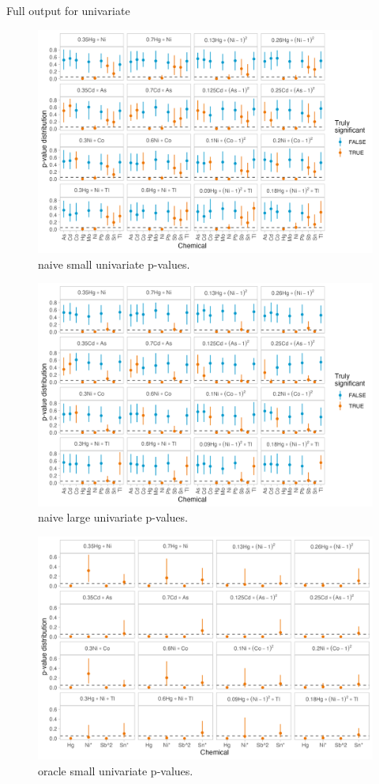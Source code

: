 \documentclass[12pt, twoside]{amherstthesis}
\begin{document}
Full output for univariate
\begin{figure}

{\centering \includegraphics[width=0.75\linewidth]{figures/ch4_nsm_univ_pval} 

}

\caption{naive small univariate p-values.}\label{fig:nsmunivp}
\end{figure}
\begin{figure}

{\centering \includegraphics[width=0.75\linewidth]{figures/ch4_nlg_univ_pval} 

}

\caption{naive large univariate p-values.}\label{fig:nlgunivp}
\end{figure}
\begin{figure}

{\centering \includegraphics[width=0.75\linewidth]{figures/ch4_osm_univ_pval} 

}

\caption{oracle small univariate p-values.}\label{fig:osmunivp}
\end{figure}
\end{document}
